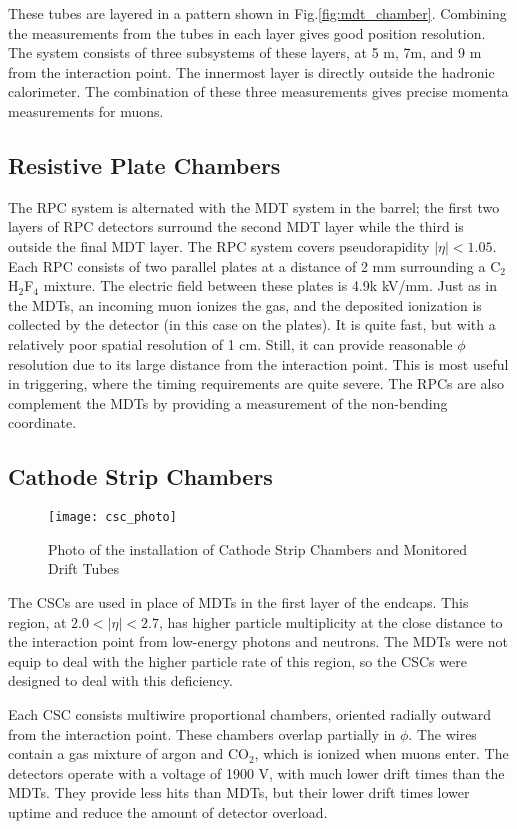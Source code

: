 These tubes are layered in a pattern shown in Fig.\ref{fig:mdt_chamber}.
Combining the measurements from the tubes in each layer gives good position resolution.
The system consists of three subsystems of these layers, at 5 m, 7m, and 9 m from the interaction point.
The innermost layer is directly outside the hadronic calorimeter.
The combination of these three measurements gives precise momenta measurements for muons.

\subsection{Resistive Plate Chambers}

The RPC system is alternated with the MDT system in the barrel; the first two layers of RPC detectors surround the second MDT layer while the third is outside the final MDT layer.
The RPC system covers pseudorapidity $|\eta| < 1.05 $.
Each RPC consists of two parallel plates at a distance of 2 mm surrounding a C$_2$H$_2$F$_4$ mixture.
The electric field between these plates is 4.9k kV/mm.
Just as in the MDTs, an incoming muon ionizes the gas, and the deposited ionization is collected by the detector (in this case on the plates).
It is quite fast, but with a relatively poor spatial resolution of 1 cm.
Still, it can provide reasonable $\phi$ resolution due to its large distance from the interaction point.
This is most useful in triggering, where the timing requirements are quite severe.
The RPCs are also complement the MDTs by providing a measurement of the non-bending coordinate.

\subsection{Cathode Strip Chambers}
\begin{figure}
\caption{Photo of the installation of Cathode Strip Chambers and Monitored Drift Tubes} \label{fig:csc_photo}
\texttt{[image: csc\_photo]}
\end{figure}

The CSCs are used in place of MDTs in the first layer of the endcaps.
This region, at $2.0 < |\eta| < 2.7$, has higher particle multiplicity at the close distance to the interaction point from low-energy photons and neutrons.
The MDTs were not equip to deal with the higher particle rate of this region, so the CSCs were designed to deal with this deficiency.

Each CSC consists multiwire proportional chambers, oriented radially outward from the interaction point.
These chambers overlap partially in $\phi$.
The wires contain a gas mixture of argon and CO$_2$, which is ionized when muons enter.
The detectors operate with a voltage of 1900 V, with much lower drift times than the MDTs.
They provide less hits than MDTs, but their lower drift times lower uptime and reduce the amount of detector overload.

